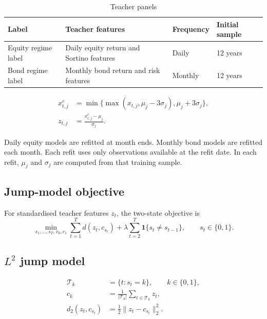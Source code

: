 \begin{table}[H]
\centering
\caption{Teacher panels}
\label{tab:app-teacher-panels}
\begin{tabular}{p{}p{}p{}p{}}
\toprule
Label & Teacher features & Frequency & Initial sample \\
\midrule
Equity regime label
& Daily equity return and Sortino features
& Daily
& 12 years \\

Bond regime label
& Monthly bond return and risk features
& Monthly
& 12 years \\
\bottomrule
\end{tabular}
\end{table}

\begin{align}
x^c_{t,j}
&=
\min\{\max(x_{t,j},\mu_j-3\sigma_j),\mu_j+3\sigma_j\}, \\
z_{t,j}
&=
\frac{x^c_{t,j}-\mu_j}{\sigma_j}.
\end{align}

Daily equity models are refitted at month ends. Monthly bond models are refitted each month.
Each refit uses only observations available at the refit date. In each refit, \(\mu_j\) and
\(\sigma_j\) are computed from that training sample.

\subsection{Jump-model objective}

For standardised teacher features \(z_t\), the two-state objective is
\begin{equation}
\min_{s_1,\ldots,s_T,\,c_0,c_1}
\sum_{t=1}^{T} d(z_t,c_{s_t})
+
\lambda\sum_{t=2}^{T}\mathbf{1}\{s_t\neq s_{t-1}\},
\qquad
s_t\in\{0,1\}.
\label{eq:app-jump-objective}
\end{equation}

\subsection{\(L^2\) jump model}

\begin{align}
\mathcal{T}_k
&=
\{t:s_t=k\}, \qquad k\in\{0,1\}, \\
c_k
&=
\frac{1}{|\mathcal{T}_k|}
\sum_{t\in\mathcal{T}_k}z_t, \\
d_2(z_t,c_{s_t})
&=
\frac{1}{2}\|z_t-c_{s_t}\|_2^2.
\end{align}

